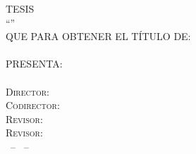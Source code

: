 \begin{titlepage}
\begin{addmargin}[-1cm]{-3cm}
{{\begin{center}
	\textsc{TESIS}\\\bigskip
	\begingroup
		{\Large
		\textsc{\color{Maroon}\textsc{``\myTitle''}}\\  
		\bigskip
		\bigskip
		}
	\endgroup
	\bigskip
	\textsc{QUE PARA OBTENER EL TÍTULO DE:}\\
	\bigskip
	{\large\textsc{\myDegree}\\\bigskip}
	\textsc{PRESENTA:}\\
	{\large\textsc{\myName}}\\ %

	{\large
	\textsc{Director: \myProf}\\
	\textsc{Codirector: \myOtherProf}\\
	\textsc{Revisor: \mySupervisor}\\
	\textsc{Revisor: \myOtherSupervisor}\\}
	\bigskip
	\bigskip
	\bigskip
	\bigskip
	\bigskip
	\textsc{\myLocation \, -- \myTime \, -- \myThesisVersion}
\end{center}}}
\endgroup
\end{addmargin}
\end{titlepage}